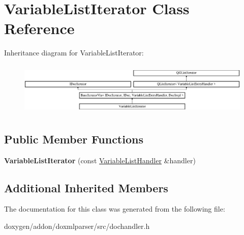 \hypertarget{class_variable_list_iterator}{}\section{Variable\+List\+Iterator Class Reference}
\label{class_variable_list_iterator}
Inheritance diagram for Variable\+List\+Iterator\+:\begin{figure}[H]
\begin{center}
\leavevmode
\includegraphics[height=2.562929cm]{class_variable_list_iterator}
\end{center}
\end{figure}
\subsection*{Public Member Functions}
\begin{DoxyCompactItemize}
\item 
\mbox{\label{class_variable_list_iterator_a447badc7bf25c021db8eda7e6c76a607}} 
{\bfseries Variable\+List\+Iterator} (const \mbox{\hyperlink{class_variable_list_handler}{Variable\+List\+Handler}} \&handler)
\end{DoxyCompactItemize}
\subsection*{Additional Inherited Members}


The documentation for this class was generated from the following file\+:\begin{DoxyCompactItemize}
\item 
doxygen/addon/doxmlparser/src/dochandler.\+h\end{DoxyCompactItemize}
